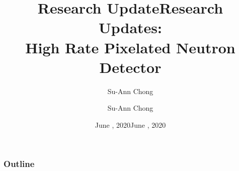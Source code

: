 \documentclass[xcolor=x11names, compress, handout]{beamer}
\title{Research Update}
\author{Su-Ann Chong}
\date{June \nth{5}, 2020}
\renewcommand{\(}{\begin{columns}}
\renewcommand{\)}{\end{columns}}
\newcommand{\<}[1]{\begin{column}{#1}}
\renewcommand{\>}{\end{column}}
\begin{document}
\begin{frame}[plain]
  \title{Research Updates:\\\large{High Rate Pixelated Neutron Detector}}

  \author{Su-Ann Chong}
  \date{June , 2020}
  \titlepage
\end{frame}


\begin{frame}
  \frametitle{Outline}
  \centering
  \begin{minipage}[t][0.5\textheight]{0.75\textwidth}
   \linespread{2.0}
   \tableofcontents
 \end{minipage}
\end{frame}
\end{document}
